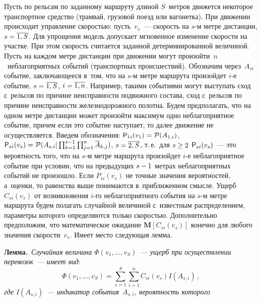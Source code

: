 \begin{multicols}{2}
    Пусть по рельсам по заданному маршруту длиной $S$~мет\-ров движется 
некоторое транспортное средство (трамвай, грузовой поезд или вагонетка). При 
движении происходит управ\-ле\-ние ско\-ростью: пусть~$v_s$~--- ско\-рость на $s$-м 
мет\-ре дистанции, $s\hm=\overline{1,S}$. Для упрощения модель допускает 
мгновенное изменение ско\-рости на участке. При этом ско\-рость считается 
заданной детерминированной величиной. Пусть на каж\-дом мет\-ре дистанции при 
движении могут произойти~$n$~неблагоприятных событий (транспортных 
происшествий). Обозначим через~$A_{si}$ событие, за\-клю\-ча\-юще\-еся в~том, что на 
$s$-м мет\-ре маршрута произойдет $i$-е событие, $s\hm= \overline{1,S}$, $i\hm= 
\overline{1,n}$. Например, такими событиями могут вы\-сту\-пать сход с~рельсов по 
причине неисправности по\-движ\-но\-го со\-ста\-ва, сход с~рельсов по причине 
не\-ис\-прав\-ности железнодорожного полотна. Будем предполагать, что на одном 
метре дистанции может произойти максимум одно неблагоприятное событие, 
причем если это событие наступает, то далее движение не осуществляется. Введем 
обо\-зна\-че\-ния: ${\sf P}_{1i}(v_1)\hm= \mathcal{P}(A_{1,i})$, ${\sf P}_{si}(v_s) \hm= 
\mathcal{P}(A_{s,i}\vert \prod\nolimits_{k=1}^{s-1} \prod\nolimits^n_{j=1} 
\overline{A}_{k,j})$, $s\hm= \overline{2,S}$, т.\,е.\ для $s\hm \geq 2$ 
${\sf P}_{si}(v_s)$~--- это ве\-ро\-ят\-ность того, что на $s$-м мет\-ре маршрута произойдет 
$i$-е неблагоприятное событие при условии, что на предыду\-щих $s\hm-1$ мет\-рах 
неблагоприятных событий не произошло. Если $P_{si}(v_s)$ не точные значения 
вероятностей, а~оценки, то равенства выше понимаются в~при\-бли\-жен\-ном смыс\-ле. 
Ущерб~$C_{si}(v_s)$ от возникновения $i$-го неблагоприятного события на $s$-м 
мет\-ре маршрута будем полагать случайной величиной с~известным 
распределением, па\-ра\-мет\-ры которого определяются только ско\-ростью. 
Дополнительно предположим, что математическое ожидание 
$\mathbf{M}[C_{si}(v_s)]$ конечно для любого значения ско\-рости~$v_s$. Имеет 
место сле\-ду\-ющая лемма.

\smallskip

\noindent
\textbf{Лемма.}\ \textit{Случайная величина $\Phi(v_1, \ldots , v_S)$~--- ущерб при 
осуществлении перевозок~--- имеет вид}: 
$$
\Phi(v_1, \ldots , v_S) =\sum\limits^S_{s=1} \sum\limits^n_{i=1} C_{si} (v_s) 
I(A_{s,i})\,,
$$
\textit{где $I(A_{s,i})$~--- индикатор события~$A_{s,i}$, ве\-ро\-ят\-ность которого} 

\vspace*{-4pt}


\end{multicols}
